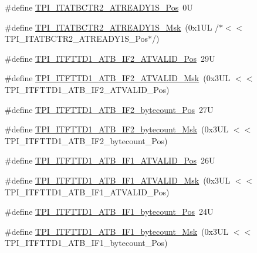 \begin{DoxyCompactItemize}
\item 
\#define \mbox{\hyperlink{group___c_m_s_i_s___t_p_i_ga52812ab751c370d2d34e55275d896128}{T\+P\+I\+\_\+\+I\+T\+A\+T\+B\+C\+T\+R2\+\_\+\+A\+T\+R\+E\+A\+D\+Y1\+S\+\_\+\+Pos}}~0U
\item 
\#define \mbox{\hyperlink{group___c_m_s_i_s___t_p_i_gabcc13f970f966e62158aea015b910f6b}{T\+P\+I\+\_\+\+I\+T\+A\+T\+B\+C\+T\+R2\+\_\+\+A\+T\+R\+E\+A\+D\+Y1\+S\+\_\+\+Msk}}~(0x1\+U\+L /$\ast$$<$$<$ T\+P\+I\+\_\+\+I\+T\+A\+T\+B\+C\+T\+R2\+\_\+\+A\+T\+R\+E\+A\+D\+Y1\+S\+\_\+\+Pos$\ast$/)
\item 
\#define \mbox{\hyperlink{group___c_m_s_i_s___t_p_i_gae08894135bf256813f4298ba0ea3964c}{T\+P\+I\+\_\+\+I\+T\+F\+T\+T\+D1\+\_\+\+A\+T\+B\+\_\+\+I\+F2\+\_\+\+A\+T\+V\+A\+L\+I\+D\+\_\+\+Pos}}~29U
\item 
\#define \mbox{\hyperlink{group___c_m_s_i_s___t_p_i_gab90afcecec23b0a84f60858a4becf101}{T\+P\+I\+\_\+\+I\+T\+F\+T\+T\+D1\+\_\+\+A\+T\+B\+\_\+\+I\+F2\+\_\+\+A\+T\+V\+A\+L\+I\+D\+\_\+\+Msk}}~(0x3\+U\+L $<$$<$ T\+P\+I\+\_\+\+I\+T\+F\+T\+T\+D1\+\_\+\+A\+T\+B\+\_\+\+I\+F2\+\_\+\+A\+T\+V\+A\+L\+I\+D\+\_\+\+Pos)
\item 
\#define \mbox{\hyperlink{group___c_m_s_i_s___t_p_i_ga1faf942e53403e99b720cd9bd337834b}{T\+P\+I\+\_\+\+I\+T\+F\+T\+T\+D1\+\_\+\+A\+T\+B\+\_\+\+I\+F2\+\_\+bytecount\+\_\+\+Pos}}~27U
\item 
\#define \mbox{\hyperlink{group___c_m_s_i_s___t_p_i_gaffb4994b50708823e386c789893a70a7}{T\+P\+I\+\_\+\+I\+T\+F\+T\+T\+D1\+\_\+\+A\+T\+B\+\_\+\+I\+F2\+\_\+bytecount\+\_\+\+Msk}}~(0x3\+U\+L $<$$<$ T\+P\+I\+\_\+\+I\+T\+F\+T\+T\+D1\+\_\+\+A\+T\+B\+\_\+\+I\+F2\+\_\+bytecount\+\_\+\+Pos)
\item 
\#define \mbox{\hyperlink{group___c_m_s_i_s___t_p_i_ga044de2a0de2700dbf131484f4ed6e7a0}{T\+P\+I\+\_\+\+I\+T\+F\+T\+T\+D1\+\_\+\+A\+T\+B\+\_\+\+I\+F1\+\_\+\+A\+T\+V\+A\+L\+I\+D\+\_\+\+Pos}}~26U
\item 
\#define \mbox{\hyperlink{group___c_m_s_i_s___t_p_i_ga3ab94563c20fa37ed1335cfba7b8cc77}{T\+P\+I\+\_\+\+I\+T\+F\+T\+T\+D1\+\_\+\+A\+T\+B\+\_\+\+I\+F1\+\_\+\+A\+T\+V\+A\+L\+I\+D\+\_\+\+Msk}}~(0x3\+U\+L $<$$<$ T\+P\+I\+\_\+\+I\+T\+F\+T\+T\+D1\+\_\+\+A\+T\+B\+\_\+\+I\+F1\+\_\+\+A\+T\+V\+A\+L\+I\+D\+\_\+\+Pos)
\item 
\#define \mbox{\hyperlink{group___c_m_s_i_s___t_p_i_ga6c7aeeb290b4fcc9ef6dc0915987434e}{T\+P\+I\+\_\+\+I\+T\+F\+T\+T\+D1\+\_\+\+A\+T\+B\+\_\+\+I\+F1\+\_\+bytecount\+\_\+\+Pos}}~24U
\item 
\#define \mbox{\hyperlink{group___c_m_s_i_s___t_p_i_gae732ca50dcfc0d2d951480ac77300fa9}{T\+P\+I\+\_\+\+I\+T\+F\+T\+T\+D1\+\_\+\+A\+T\+B\+\_\+\+I\+F1\+\_\+bytecount\+\_\+\+Msk}}~(0x3\+U\+L $<$$<$ T\+P\+I\+\_\+\+I\+T\+F\+T\+T\+D1\+\_\+\+A\+T\+B\+\_\+\+I\+F1\+\_\+bytecount\+\_\+\+Pos)

\end{DoxyCompactItemize}
